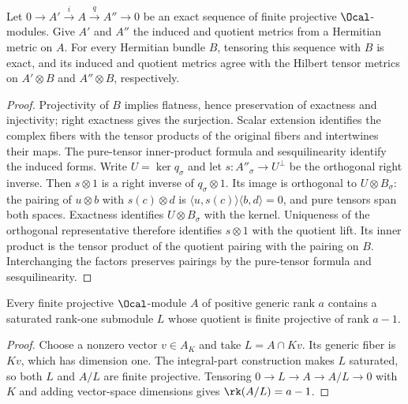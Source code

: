 \begin{lemma}
\label{lem:tensor-exact-metrics}
\leanok
Let $0\to A'\xrightarrow{i}A\xrightarrow{q}A''\to0$ be an exact
sequence of finite projective $\Ocal$-modules. Give $A'$ and $A''$ the
induced and quotient metrics from a Hermitian metric on $A$. For every
Hermitian bundle $B$, tensoring this sequence with $B$ is exact, and its
induced and quotient metrics agree with the Hilbert tensor metrics on
$A'\otimes B$ and $A''\otimes B$, respectively.
\end{lemma}
\begin{proof}
Projectivity of $B$ implies flatness, hence preservation of exactness and
injectivity; right exactness gives the surjection. Scalar extension
identifies the complex fibers with the tensor products of the original
fibers and intertwines their maps. The pure-tensor inner-product formula
and sesquilinearity identify the induced forms. Write $U=\ker q_\sigma$
and let $s:A''_\sigma\to U^\perp$ be the orthogonal right inverse.
Then $s\otimes1$ is a right inverse of $q_\sigma\otimes1$. Its image is
orthogonal to $U\otimes B_\sigma$: the pairing of $u\otimes b$ with
$s(c)\otimes d$ is $\langle u,s(c)\rangle\langle b,d\rangle=0$,
and pure tensors span both spaces. Exactness identifies $U\otimes
B_\sigma$ with the kernel. Uniqueness of the orthogonal representative
therefore identifies $s\otimes1$ with the quotient lift. Its inner product
is the tensor product of the quotient pairing with the pairing on $B$.
Interchanging the factors preserves pairings by the pure-tensor formula
and sesquilinearity.
\end{proof}

\begin{lemma}
\label{lem:rank-one-saturated-reduction}
\leanok
Every finite projective $\Ocal$-module $A$ of positive generic rank $a$
contains a saturated rank-one submodule $L$ whose quotient is finite
projective of rank $a-1$.
\end{lemma}
\begin{proof}
Choose a nonzero vector $v\in A_K$ and take $L=A\cap Kv$. Its generic
fiber is $Kv$, which has dimension one. The integral-part construction
makes $L$ saturated, so both $L$ and $A/L$ are finite projective. Tensoring
$0\to L\to A\to A/L\to0$ with $K$ and adding vector-space dimensions
gives $\rk(A/L)=a-1$.
\end{proof}

